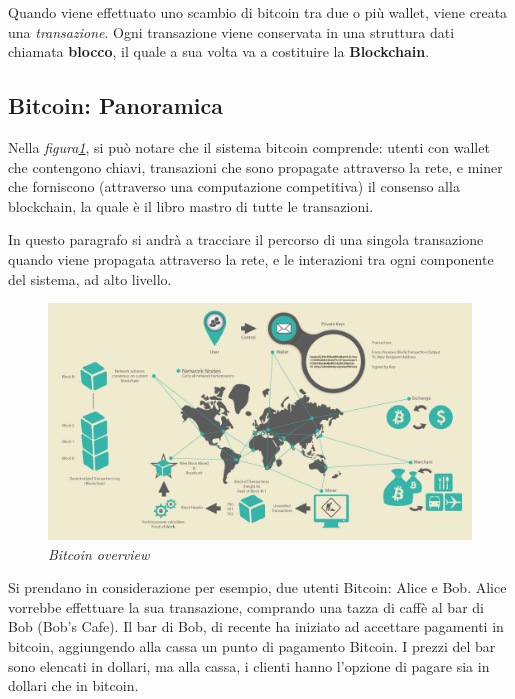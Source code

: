 Quando viene effettuato uno scambio di bitcoin tra due o più wallet, viene creata una \textit{transazione}. Ogni transazione viene conservata in una struttura dati chiamata \textbf{blocco}, il quale a sua volta va a costituire la \textbf{Blockchain}.

\subsection{Bitcoin: Panoramica}

Nella \textit{figura\ref{fig:overview}}, si può notare che il sistema bitcoin comprende: utenti con wallet che contengono chiavi, transazioni che sono propagate attraverso la rete, e miner che forniscono (attraverso una computazione competitiva) il consenso alla blockchain, la quale è il libro mastro di tutte le transazioni. 

In questo paragrafo si andrà a tracciare il percorso di una singola transazione quando viene propagata attraverso la rete, e le interazioni tra ogni componente del sistema, ad alto livello.

\begin{figure}[h]
	\centering
	\includegraphics[width= \linewidth]{figure/overview}
	\caption{\textit{Bitcoin overview} \label{fig:overview}}
\end{figure}

Si prendano in considerazione per esempio, due utenti Bitcoin: Alice e Bob. Alice vorrebbe effettuare la sua transazione, comprando una tazza di caffè al bar di Bob (Bob's Cafe). Il bar di Bob, di recente ha iniziato ad accettare pagamenti in bitcoin, aggiungendo alla cassa un punto di pagamento Bitcoin. I prezzi del bar sono elencati in dollari, ma alla cassa, i clienti hanno l'opzione di pagare sia in dollari che in bitcoin.

